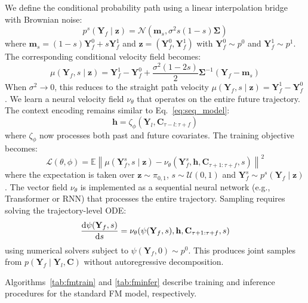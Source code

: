 \documentclass[preprint,12pt,authoryear]{elsarticle}
\begin{document}
We define the conditional probability path using a linear interpolation bridge with Brownian noise:
\begin{equation}
    p^s(\mathbf{Y}_f \mid \mathbf{z}) = \mathcal{N}\left(\mathbf{m}_s, \sigma^2 s(1-s)\mathbf{\Sigma}\right)
\end{equation}
where $\mathbf{m}_s = (1-s)\mathbf{Y}_f^0 + s\mathbf{Y}_f^1$ and $\mathbf{z} = (\mathbf{Y}_f^0, \mathbf{Y}_f^1)$ with $\mathbf{Y}_f^0 \sim p^0$ and $\mathbf{Y}_f^1 \sim p^1$. The corresponding conditional velocity field becomes:
\begin{equation}
    \mu(\mathbf{Y}_f, s\mid\mathbf{z}) = \mathbf{Y}_f^1 - \mathbf{Y}_f^0 + \frac{\sigma^2(1-2s)}{2}\mathbf{\Sigma}^{-1}(\mathbf{Y}_f - \mathbf{m}_s)
\end{equation}
When $\sigma^2 \to 0$, this reduces to the straight path velocity $\mu(\mathbf{Y}_f,s\mid\mathbf{z}) = \mathbf{Y}_f^1 - \mathbf{Y}_f^0$.
We learn a neural velocity field $\nu_\theta$ that operates on the entire future trajectory. The context encoding remains similar to Eq.~\eqref{eq:seq_model}:
\begin{equation}
    \mathbf{h} = \zeta_\phi(\mathbf{Y}_l, \mathbf{C}_{\tau-l:\tau+f})
\end{equation}
where $\zeta_\phi$ now processes both past and future covariates. The training objective becomes:
\begin{equation}
    \mathcal{L}(\theta, \phi) = \mathbb{E} \left\| \mu(\mathbf{Y}_f^s, s\mid\mathbf{z}) - \nu_\theta(\mathbf{Y}_f^s, \mathbf{h}, \mathbf{C}_{\tau+1:\tau+f}, s) \right\|^2
\end{equation}
where the expectation is taken over $\mathbf{z} \sim \pi_{0,1}$, $s \sim \mathcal{U}(0,1)$ and $\mathbf{Y}_f^s \sim p^s(\mathbf{Y}_f\mid\mathbf{z})$. The vector field $\nu_\theta$ is implemented as a sequential neural network (e.g., Transformer or RNN) that processes the entire trajectory.
Sampling requires solving the trajectory-level ODE:
\begin{equation}
    \dv{\psi(\mathbf{Y}_f,s)}{s} = \nu_\theta(\psi(\mathbf{Y}_f,s), \mathbf{h}, \mathbf{C}_{\tau+1:\tau+f}, s)
\end{equation}
using numerical solvers subject to $\psi(\mathbf{Y}_f,0) \sim p^0$. This produces joint samples from $p(\mathbf{Y}_f\mid\mathbf{Y}_l,\mathbf{C})$ without autoregressive decomposition.

Algorithms~\ref{tab:fmtrain} and \ref{tab:fminfer} describe training and inference procedures for the standard FM model, respectively.
\end{document}
